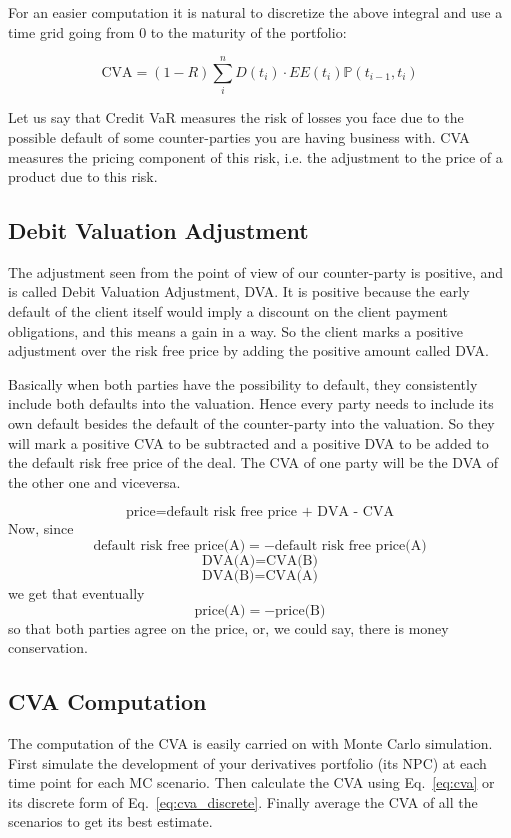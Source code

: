For an easier computation it is natural to discretize the above integral
and use a time grid going from 0 to the maturity of the portfolio:

\begin{equation}
\text{CVA} = (1-R) \sum_i^n D(t_i) \cdot EE(t_i) \mathbb{P}(t_{i-1}, t_i)
\label{eq:cva_discrete}
\end{equation}

Let us say that Credit VaR measures the risk of losses you
face due to the possible default of some counter-parties you are having
business with. CVA measures the pricing component of this risk, i.e.
the adjustment to the price of a product due to this risk.

\subsection{Debit Valuation Adjustment}

The adjustment seen from the point of view of our counter-party is positive, and is called Debit Valuation Adjustment, DVA. It is positive because the early default of the client itself would imply a discount on the client payment obligations, and this means a gain in a way. So the client marks a positive adjustment over the risk free price by adding the positive amount called DVA. 

Basically when both parties have the possibility to default, they
consistently include both defaults into the valuation. Hence
every party needs to include its own default besides the default of the
counter-party into the valuation. So they will mark a positive
CVA to be subtracted and a positive DVA to be added to the default
risk free price of the deal. The CVA of one party will be the DVA of
the other one and viceversa.

\[
\textrm{price}=\textrm{default risk free price + DVA - CVA}
\]
Now, since
\[
\textrm{default risk free price(A)} = - \textrm{default risk free price(A)}
\]
\[
\textrm{DVA(A)} = \textrm{CVA(B)}
\]
\[
\textrm{DVA(B)} = \textrm{CVA(A)}
\]
we get that eventually
\[
\textrm{price(A)} = -\textrm{price(B)}
\]
so that both parties agree on the price, or, we could say, there is money
conservation.

\subsection{CVA Computation}

The computation of the CVA is easily carried on with Monte Carlo simulation.
First simulate the development of your derivatives portfolio (its NPC) at each time point for each MC scenario. 
Then calculate the CVA using Eq.~\ref{eq:cva} or its discrete form of Eq.~\ref{eq:cva_discrete}.
Finally average the CVA of all the scenarios to get its best estimate.


